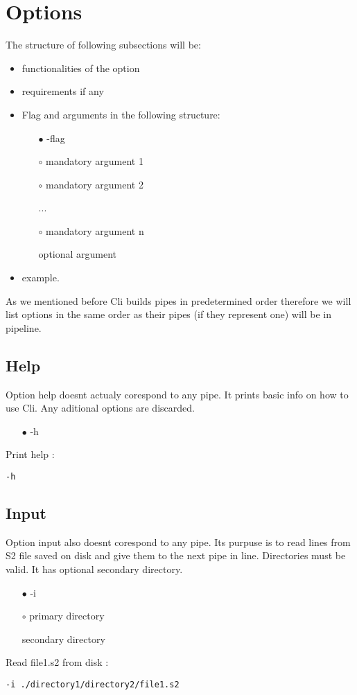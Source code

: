 \documentclass[english]{article}
\begin{document}
\section{Options}
The structure of following subsections will be:
\begin{itemize}
\item functionalities of the option
\item requirements if any
\item{
Flag and arguments in the following structure:
 \begin{itemize}
 \item[$\bullet$] -flag
 \item[$\circ$] mandatory argument 1
 \item[$\circ$] mandatory argument 2
 
 ...
  \item[$\circ$] mandatory argument n
  \item[\textasteriskcentered] optional argument
 \end{itemize}
 }
\item example.
\end{itemize}

As we mentioned before Cli builds pipes in predetermined order therefore we will list options in the same order as their pipes (if they represent one) will be in pipeline.

\subsection{Help}
Option help doesnt actualy corespond to any pipe. It prints basic info on how to use Cli. Any aditional options are discarded.
\begin{itemize}
\item[$\bullet$] -h
\end{itemize}
Print help : \begin{lstlisting} 
-h
\end{lstlisting}


\subsection{Input}
Option input also doesnt corespond to any pipe. Its purpuse is to read lines from S2 file saved on disk and give them to the next pipe in line. Directories must be valid. It has optional secondary directory.
\begin{itemize}
\item[$\bullet$] -i
\item[$\circ$] primary directory
\item[\textasteriskcentered] secondary directory
\end{itemize}
Read file1.s2 from disk : \begin{lstlisting} 
-i ./directory1/directory2/file1.s2
\end{lstlisting}
\end{document}
